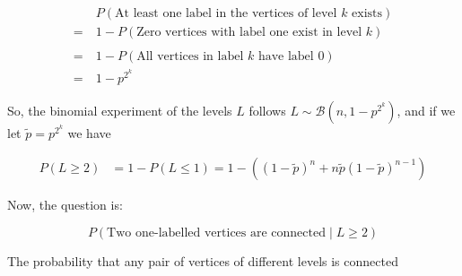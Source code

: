 \documentclass[a4paper, 12pt]{article}
\begin{document}
\begin{align*}
  &P(\text{At least one label in the vertices of level $k$ exists}) 
  \\=~& 1 - P(\text{Zero vertices with label one exist in level $k$}) \\ 
  \\=~& 1 - P(\text{All vertices in label $k$ have label 0}) \\ 
  = ~ &1- p^{2^k}
\end{align*}

So, the binomial experiment of the levels $L$ follows $L \sim \mathcal{B}(n, 1 - p^{2^k})$,
and if we let $\widetilde{ p } = p^{2^k} $ we have

\begin{align*}
  P(L \geq 2) 
  &= 1 - P(L \leq 1) = 1 - \left( (1-\widetilde{ p } )^n +
  n\widetilde{ p }(1 - \widetilde{ p } )^{n-1}  \right) 
\end{align*}

Now, the question is:

\begin{equation*}
  P(\text{Two one-labelled vertices are connected} \mid L\geq 2)
\end{equation*}

The probability that any pair of vertices of different levels is connected
\end{document}
